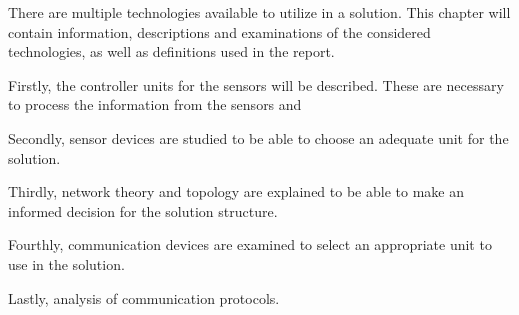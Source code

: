 There are multiple technologies available to utilize in a solution. This chapter will contain information, descriptions and examinations of the considered technologies, as well as definitions used in the report.

Firstly, the controller units for the sensors will be described. These are necessary to process the information from the sensors and 

Secondly, sensor devices are studied to be able to choose an adequate unit for the solution.

Thirdly, network theory and topology are explained to be able to make an informed decision for the solution structure. 

Fourthly, communication devices are examined to select an appropriate unit to use in the solution. 

Lastly, analysis of communication protocols.






